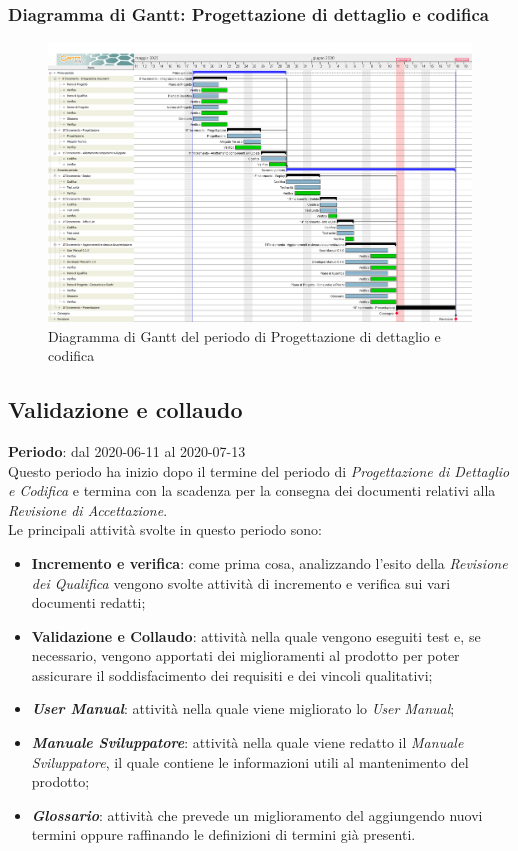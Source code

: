 	\subsubsection{Diagramma di Gantt: Progettazione di dettaglio e codifica}
		\begin{figure}[h]
			\centering
			\includegraphics[width=1.1\textwidth]{./res/img/DiagrammiGantt/prog_dett_gantt.png}
			\caption{Diagramma di Gantt del periodo di Progettazione di dettaglio e codifica}
		\end{figure}
\newpage
\subsection{Validazione e collaudo}
\textbf{Periodo}: dal 2020-06-11 al 2020-07-13 \\
Questo periodo ha inizio dopo il termine del periodo di \textit{Progettazione di Dettaglio e Codifica} e termina con la scadenza per la consegna dei documenti relativi alla \textit{Revisione di Accettazione}. \\
Le principali attività svolte in questo periodo sono:
\begin{itemize}
	\item \textbf{Incremento e verifica}: come prima cosa, analizzando l'esito della \textit{Revisione dei Qualifica} vengono svolte attività di incremento e verifica sui vari documenti redatti;
	\item \textbf{Validazione e Collaudo}: attività nella quale vengono eseguiti test e, se necessario, vengono apportati dei miglioramenti al prodotto per poter assicurare il soddisfacimento dei requisiti e dei vincoli qualitativi;
	\item \textbf{\textit{User Manual}}: attività nella quale viene migliorato lo \textit{User Manual};
	\item \textbf{\textit{Manuale Sviluppatore}}: attività nella quale viene redatto il \textit{Manuale Sviluppatore}, il quale contiene le informazioni utili al mantenimento del prodotto;
	\item \textbf{\textit{Glossario}}: attività che prevede un miglioramento del \Glossario aggiungendo nuovi termini oppure raffinando le definizioni di termini già presenti.
\end{itemize}
